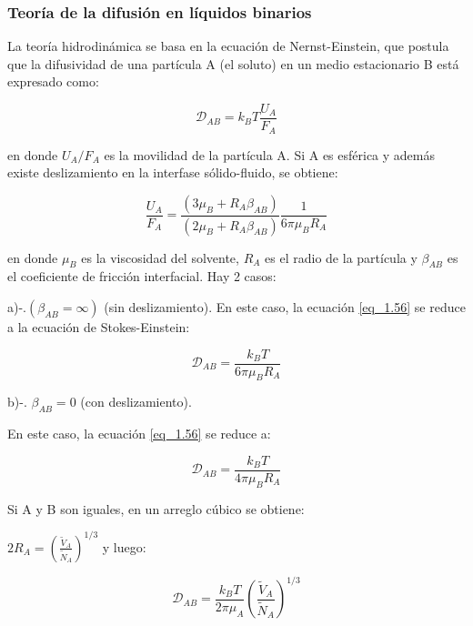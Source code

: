 \subsubsection{Teoría de la difusión en líquidos binarios}
La teoría hidrodinámica se basa en la ecuación de Nernst-Einstein, que postula que la difusividad de una partícula A (el soluto) en un medio estacionario B está expresado como:

\begin{equation}
\mathscr{D}_{AB} = k_B T \frac{U_A}{F_A}\tag{1.56}\label{eq_1.56}
\end{equation}

en donde $U_A/F_A $ es la movilidad de la partícula A. Si A es esférica y además existe deslizamiento en la interfase sólido-fluido, se obtiene:

\begin{equation}
\frac{U_A}{F_A} = \frac{(3 \mu_B + R_A \beta_{AB})}{({2 \mu_B + R_A \beta_{AB}} )}  \frac{1}{6 \pi \mu_B R_A}\tag{1.57}\label{eq_1.57}
\end{equation}

en donde \( \mu_B \) es la viscosidad del solvente, \( R_A \) es el radio de la partícula y \( \beta_{AB} \) es el coeficiente de fricción interfacial. Hay 2 casos:

a)-.$( \beta_{AB} = \infty )$ (sin deslizamiento).
   En este caso, la ecuación \ref{eq_1.56} se reduce a la ecuación de Stokes-Einstein:

   \begin{equation}
   \mathscr{D}_{AB} = \frac{k_B T}{6 \pi \mu_B R_A}\tag{1.58}\label{eq_1.58}
   \end{equation}

b)-. \( \beta_{AB} = 0 \) (con deslizamiento).  

   En este caso, la ecuación \ref{eq_1.56} se reduce a:

   \begin{equation}
   \mathscr{D}_{AB} = \frac{k_B T}{4 \pi \mu_B R_A}\tag{1.59}\label{eq_1.59}
   \end{equation}

Si A y B son iguales, en un arreglo cúbico se obtiene:


$2 R_A = \left( \frac{\widetilde{V}_A}{\widetilde{N}_A} \right)^{1/3}$ y luego:

\begin{equation}
\mathscr{D}_{AB} = \frac{k_B T}{2 \pi \mu_A} \left( \frac{\widetilde{V}_A}{\widetilde{N}_A} \right)^{1/3}\tag{1.60}\label{eq_1.60}
\end{equation}

